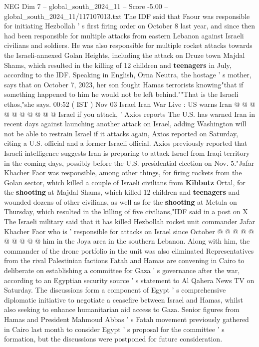 \begin{textsample}{NEG Dim 7 – global\_south\_2024\_11 – Score -5.00 – global\_south\_2024\_11/117107013.txt}
The IDF said that Faour was responsible for initiating Hezbollah ' s first firing order on October 8 last year, and since then had been responsible for multiple attacks from eastern Lebanon against Israeli civilians and soldiers.
He was also responsible for multiple rocket attacks towards the Israeli-annexed Golan Heights, including the attack on Druze town Majdal Shams, which resulted in the killing of 12 children and \textbf{teenagers} in July, according to the IDF.
Speaking in English, Orna Neutra, the hostage ' s mother, says that on October 7, 2023, her son fought Hamas terrorists knowing"that if something happened to him he would not be left behind.""That is the Israeli ethos,"she says. 00:52 ( IST ) Nov 03 Israel Iran War Live : US warns Iran @ @ @ @ @ @ @ @ @ @ Israel if you attack, ' Axios reports The U.S. has warned Iran in recent days against launching another attack on Israel, adding Washington will not be able to restrain Israel if it attacks again, Axios reported on Saturday, citing a U.S. official and a former Israeli official.
Axios previously reported that Israeli intelligence suggests Iran is preparing to attack Israel from Iraqi territory in the coming days, possibly before the U.S. presidential election on Nov. 5."Jafar Khacher Faor was responsible, among other things, for firing rockets from the Golan sector, which killed a couple of Israeli civilians from \textbf{Kibbutz} Ortal, for the \textbf{shooting} at Majdal Shams, which killed 12 children and \textbf{teenagers} and wounded dozens of other civilians, as well as for the \textbf{shooting} at Metula on Thursday, which resulted in the killing of five civilians,"IDF said in a post on X The Israeli military said that it has killed Hezbollah rocket unit commander Jafar Khacher Faor who is ' responsible for attacks on Israel since October @ @ @ @ @ @ @ @ @ @ him in the Joya area in the southern Lebanon.
Along with him, the commander of the drone portfolio in the unit was also eliminated Representatives from the rival Palestinian factions Fatah and Hamas are convening in Cairo to deliberate on establishing a committee for Gaza ' s governance after the war, according to an Egyptian security source ' s statement to Al Qahera News TV on Saturday.
The discussions form a component of Egypt ' s comprehensive diplomatic initiative to negotiate a ceasefire between Israel and Hamas, whilst also seeking to enhance humanitarian aid access to Gaza.
Senior figures from Hamas and President Mahmoud Abbas ' s Fatah movement previously gathered in Cairo last month to consider Egypt ' s proposal for the committee ' s formation, but the discussions were postponed for future consideration.

\end{textsample}
